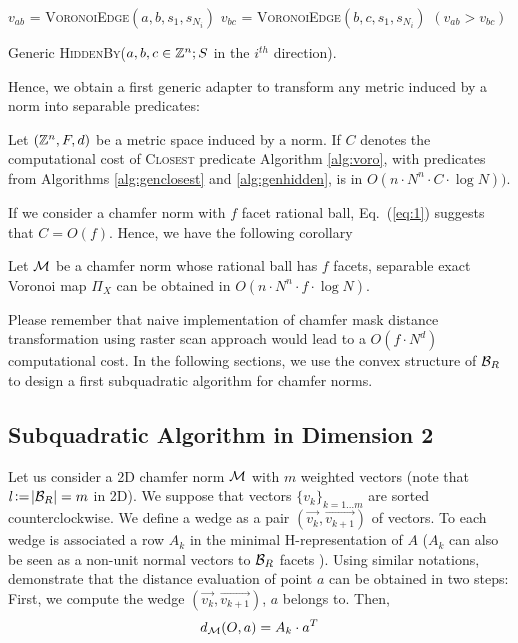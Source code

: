 \documentclass{llncs}
\begin{document}
\begin{algorithm}[H]\footnotesize
  $v_{ab}$ = \textsc{VoronoiEdge}$(a,b,s_1, s_{N_i})$\;
  $v_{bc}$ = \textsc{VoronoiEdge}$(b,c,s_1, s_{N_i})$\;
  \Return $(v_{ab}> v_{bc})$\;
  \caption{Generic \textsc{HiddenBy}($a,b,c\in{\mathbb{Z}}^n; S$ in the $i^{th}$
    direction).\label{alg:genhidden}}
\end{algorithm}

Hence, we obtain a first generic adapter to transform any metric
induced by a norm into separable predicates:

\begin{lemma}
\label{lem:generic}
   Let $({\mathbb{Z}}^n, F, d)$ be a metric space induced by a norm. If $C$
   denotes the computational cost of \textsc{Closest} predicate
   Algorithm \ref{alg:voro},  with predicates from Algorithms
   \ref{alg:genclosest} and \ref{alg:genhidden}, is in $O(n\cdot N^n\cdot C\cdot \log{N}))$.
\end{lemma}

If we consider a chamfer norm with $f$ facet rational ball, Eq.~(\ref{eq:1})
suggests that $C=O(f)$. Hence, we have the following corollary
\begin{corollary}
  Let $\mathcal{M}$ be a chamfer norm whose rational ball has $f$ facets,
  separable exact Voronoi map $\Pi_X$ can be obtained in
    $O(n\cdot N^n\cdot f \cdot \log{N})$.
\end{corollary}

Please remember that naive implementation of chamfer mask distance
transformation using raster scan approach would lead to a $O(f\cdot
N^d)$ computational cost. In the following sections, we use the convex
structure of $\mathcal{B}_R$ to design a first subquadratic algorithm for chamfer
norms.

\subsection{Subquadratic Algorithm in Dimension 2}
\label{sec:subq-algor-dimens}

Let us consider a 2D chamfer norm $\mathcal{M}$ with $m$ weighted vectors (note
that $l\!\mathrel{\mathop:}=\!|\mathcal{B}_R| = m$ in 2D). We suppose that vectors
$\{v_k\}_{k=1\ldots m}$ are sorted counterclockwise. We define a wedge
as a pair $(\vec{v_k},\vec{v_{k+1}})$ of vectors. To each wedge is
associated a row $A_k$ in the minimal H-representation of $A$ ($A_k$
can also be seen as a non-unit normal vectors to $\mathcal{B}_R$ facets
\cite{DBLP:journals/pr/NormandE09}). Using similar notations,
\cite{Thiel_hdr,Strand2008} demonstrate that the distance evaluation
of point $a$ can be obtained in two steps: First, we compute the wedge
$(\vec{v_k},\vec{v_{k+1}})$, $a$ belongs to. Then,
\begin{equation}
\label{eq:2}
  d_{\mathcal{M}}(O,a) = A_k\cdot a^T
\end{equation}
\end{document}
